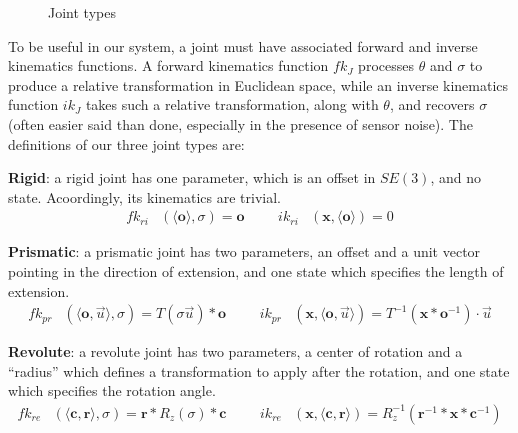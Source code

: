 \documentclass[a4paper,orivec]{llncs}
\def\xvec{\vec}          \def\xvecstr{with an arrow}
\def\xse{\bm}            \def\xsestr{in boldface}
\begin{document}
\begin{figure}[ht]
  \hfill
  \vspace{.5in}
  \caption{Joint types}
  \label{fig:joint-types}
  \vspace{-.2in}
\end{figure}

To be useful in our system, a joint must have associated forward and inverse kinematics functions. A forward kinematics function $fk_J$ processes $\theta$ and $\sigma$ to produce a relative transformation in Euclidean space, while an inverse kinematics function $ik_J$ takes such a relative transformation, along with $\theta$, and recovers $\sigma$ (often easier said than done, especially in the presence of sensor noise). The definitions of our three joint types are:

\begin{itemize*}
  \item \textbf{Rigid}: a rigid joint has one parameter, which is an offset in $SE(3)$, and no state. Acoordingly, its kinematics are trivial.
    \begin{align}
      fk_{ri}&(\langle \xse{o} \rangle, \sigma) = \xse{o} &&&
      ik_{ri}&(\xse{x}, \langle \xse{o} \rangle) = 0 \nonumber
    \end{align}
  \item \textbf{Prismatic}: a prismatic joint has two parameters, an offset and a unit vector pointing in the direction of extension, and one state which specifies the length of extension.
    \begin{align}
      fk_{pr}&(\langle \xse{o}, \xvec{u} \rangle, \sigma) = T(\sigma \xvec{u}) * \xse{o} &&&
      ik_{pr}&(\xse{x}, \langle \xse{o}, \xvec{u} \rangle) = T^{-1}(\xse{x}*\xse{o}^{-1}) \cdot \xvec{u} \nonumber
    \end{align}
  \item \textbf{Revolute}: a revolute joint has two parameters, a center of rotation and a ``radius'' which defines a transformation to apply after the rotation, and one state which specifies the rotation angle.
    \begin{align}
      fk_{re}&(\langle \xse{c}, \xse{r} \rangle, \sigma) = \xse{r} * R_z(\sigma) * \xse{c} &&&
      ik_{re}&(\xse{x}, \langle \xse{c}, \xse{r} \rangle) = R_z^{-1}(\xse{r}^{-1}*\xse{x}*\xse{c}^{-1}) \nonumber
    \end{align}
\end{itemize*}
\end{document}
